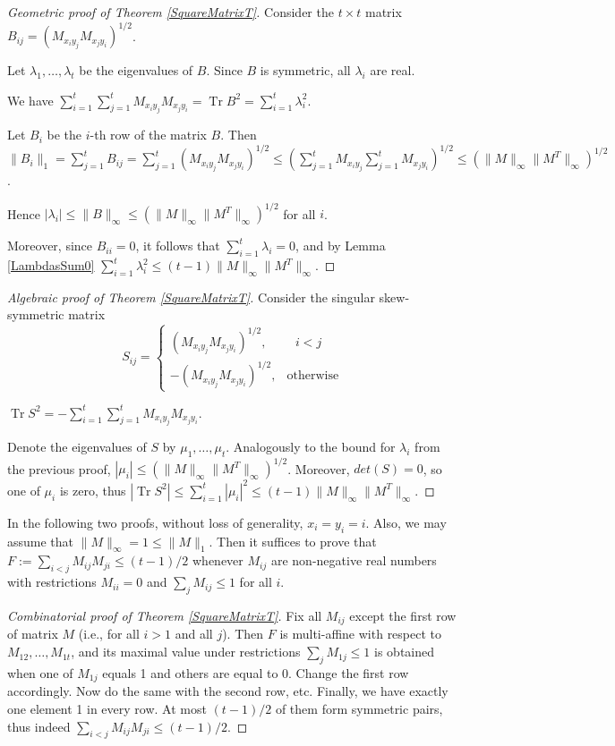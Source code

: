 \documentclass[12pt]{article}
\theoremstyle{definition}
\theoremstyle{plain}
\renewcommand{\leq}{\leqslant}
\DeclareMathOperator{\Tr}{Tr}
\begin{document}
\begin{proof}[Geometric proof of Theorem \ref{SquareMatrixT}]
Consider the $t \times t$ matrix $B_{ij} = (M_{x_iy_j}M_{x_jy_i})^{1/2}$.

Let $\lambda_1, \dots, \lambda_t$ be the eigenvalues of $B$. Since $B$ is symmetric, all $\lambda_i$ are real.

We have $\sum_{i=1}^{t} \sum_{j=1}^t M_{x_i y_j} M_{x_j y_i}= \Tr B^2= \sum_{i=1}^{t} \lambda_i^2$.

Let $B_i$ be the $i$-th row of the matrix $B$. Then $\|B_i\|_1 = \sum_{j=1}^t B_{ij} = \sum_{j=1}^t (M_{x_iy_j}M_{x_jy_i})^{1/2} \leq (\sum_{j=1}^t M_{x_iy_j}\sum_{j=1}^t M_{x_jy_i})^{1/2} \leq (\|M\|_{\infty} \|M^T\|_{\infty})^{1/2}$.

Hence $|\lambda_i| \leq \|B\|_{\infty} \leq (\|M\|_{\infty} \|M^T\|_{\infty})^{1/2}$ for all $i$.

Moreover, since $B_{ii} = 0$, it follows that $\sum_{i=1}^t \lambda_i = 0$, and by Lemma
\ref{LambdasSum0} $\sum_{i=1}^{t} \lambda_i^2 \leq (t-1)\|M\|_{\infty} \|M^T\|_{\infty}$.

\end{proof}

\begin{proof}[Algebraic proof of Theorem \ref{SquareMatrixT}]
Consider the singular skew-symmetric matrix 
$$
S_{ij}=\begin{cases}
			(M_{x_iy_j}M_{x_jy_i})^{1/2}, & \text{ $i < j$ }\\
            -(M_{x_iy_j}M_{x_jy_i})^{1/2}, & \text{otherwise}
		 \end{cases}
$$

$\Tr S^2 = - \sum_{i=1}^{t} \sum_{j=1}^t M_{x_i y_j} M_{x_j y_i}$.

Denote the eigenvalues of $S$ by $\mu_1, \dots, \mu_t$. Analogously to the bound for $\lambda_i$ from the previous proof, $|\mu_i| \leq (\|M\|_{\infty} \|M^T\|_{\infty})^{1/2}$. Moreover, $det(S)=0$, so one of $\mu_i$ is zero, thus $|\Tr S^2| \leq \sum_{i=1}^{t} |\mu_i|^2 \leq (t -1)\|M\|_{\infty} \|M^T\|_{\infty}$.
\end{proof}

In the following two proofs, without loss of generality, $x_i=y_i=i$. Also, we may assume that $\|M\|_\infty=1\leqslant \|M\|_1$.
Then it suffices to prove that $F:=\sum_{i<j} M_{ij}M_{ji}\leqslant (t-1)/2$ whenever
$M_{ij}$ are non-negative real numbers with restrictions $M_{ii}=0$ and
$\sum_j M_{ij}\leqslant 1$ for all $i$.

\begin{proof}[Combinatorial proof of Theorem \ref{SquareMatrixT}]
Fix all $M_{ij}$ except the first row of matrix $M$ (i.e., for all $i>1$ and all $j$). Then $F$ is multi-affine with respect to $M_{12},\ldots,M_{1t}$,
and its maximal value under restrictions $\sum_j M_{1j}\leqslant 1$ is obtained when one of
$M_{1j}$ equals 1 and others are equal to 0. Change the first row accordingly. Now do the same with the second row, etc. Finally, we have exactly one element 1 in every row. At most $(t-1)/2$ of them form
symmetric pairs, thus indeed $\sum_{i<j} M_{ij}M_{ji}\leqslant (t-1)/2$. 
\end{proof}
\end{document}
